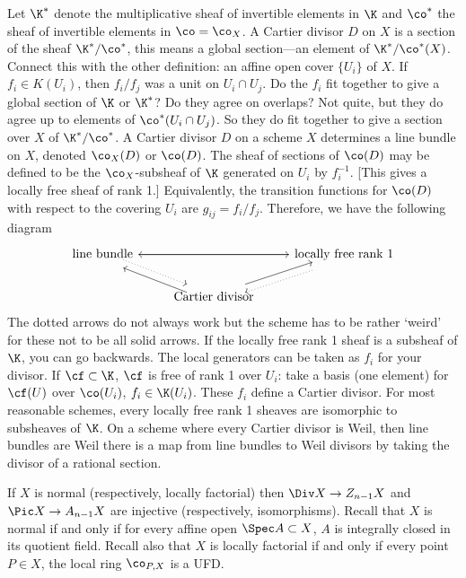 Let $\K^*$ denote the multiplicative sheaf of invertible elements in $\K$ and $\co^*$ the sheaf of invertible elements in $\co=\co_X$. A Cartier divisor $D$ on $X$ is a section of the sheaf $\K^*/\co^*$, this means a global section---an element of $\K^*/\co^*(X)$. Connect this with the other definition: an affine open cover $\{U_i\}$ of $X$. If $f_i \in K(U_i)$, then $f_i/f_j$ was a unit on $U_i \cap U_j$. Do the $f_i$ fit together to give a global section of $\K$ or $\K^*$? Do they agree on overlaps? Not quite, but they do agree up to elements of $\co^*(U_i \cap U_j)$. So they do fit together to give a section over $X$ of $\K^*/\co^*$. A Cartier divisor $D$ on a scheme $X$ determines a line bundle on $X$, denoted $\co_X(D)$ or $\co(D)$. The sheaf of sections of $\co(D)$ may be defined to be the $\co_X$-subsheaf of $\K$ generated on $U_i$ by $f_i^{-1}$. [This gives a locally free sheaf of rank 1.] Equivalently, the transition functions for $\co(D)$ with respect to the covering $U_i$ are $g_{ij}= f_i/f_j$. Therefore, we have the following diagram
	\[
	\begin{tikzcd}
	\text{line bundle} \arrow{rr} \arrow[dotted,yshift=0.5ex]{dr} & & \text{locally free rank 1} \arrow{ll} \arrow[dotted,yshift=-1ex]{dl} \\
	& \text{Cartier divisor} \arrow[yshift=-1ex]{ul} \arrow[yshift=0.5ex]{ur} & 
	\end{tikzcd}
	\]
The dotted arrows do not always work but the scheme has to be rather `weird' for these not to be all solid arrows. If the locally free rank 1 sheaf is a subsheaf of $\K$, you can go backwards. The local generators can be taken as $f_i$ for your divisor. If $\cf \subset \K$, $\cf$ is free of rank 1 over $U_i$: take a basis (one element) for $\cf(U)$ over $\co(U_i)$, $f_i \in \K(U_i)$. These $f_i$ define a Cartier divisor. For most reasonable schemes, every locally free rank 1 sheaves are isomorphic to subsheaves of $\K$. On a scheme where every Cartier divisor is Weil, then line bundles are Weil there is a map from line bundles to Weil divisors by taking the divisor of a rational section. 


\begin{ex}[EGA, IV.21.6]
If $X$ is normal (respectively, locally factorial) then $\Div X \to Z_{n-1} X$ and $\Pic X \to A_{n-1} X$ are injective (respectively, isomorphisms). Recall that $X$ is normal if and only if for every affine open $\Spec A \subset X$, $A$ is integrally closed in its quotient field. Recall also that $X$ is locally factorial if and only if every point $P \in X$, the local ring $\co_{P,X}$ is a UFD. 
\end{ex}


